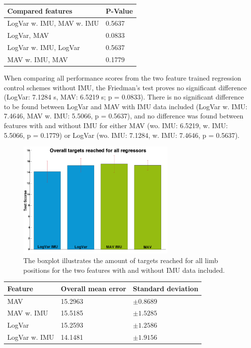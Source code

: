\begin{center}
	\begin{tabular}{l l}
		\toprule
		\textbf{Compared features} & \textbf{P-Value}\\
		\midrule
		LogVar w. IMU, MAV w. IMU & 0.5637 \\
		LogVar, MAV & 0.0833 \\
		LogVar w. IMU, LogVar & 0.5637 \\
		MAV w. IMU, MAV & 0.1779 \\
		\bottomrule
	\end{tabular}
\end{center}

When comparing all performance scores from the two feature trained regression control schemes without IMU, the Friedman's test proves no significant difference (LogVar: 7.1284 s, MAV: 6.5219 s; p = 0.0833). There is no significant difference to be found between LogVar and MAV with IMU data included (LogVar w. IMU: 7.4646, MAV w. IMU: 5.5066, p = 0.5637), and no difference was found between features with and without IMU for either MAV (wo. IMU: 6.5219, w. IMU: 5.5066, p = 0.1779) or LogVar (wo. IMU: 7.1284, w. IMU: 7.4646, p = 0.5637).


\begin{figure}[H]
	\includegraphics[width=0.7\textwidth]{figures/results/sumMoreBarsWithTargetsReachedForAllRegressors}  %
	\caption{The boxplot illustrates the amount of targets reached for all limb positions for the two features with and without IMU data included.}
	\label{fig:TargetsReachedOverall}  %
\end{figure}

\begin{center}
	\begin{tabular}{l l l}
		\toprule
		\textbf{Feature} & \textbf{Overall mean error} & \textbf{Standard deviation}\\
		\midrule
		MAV & 15.2963 & $\pm 0.8689$ \\
		MAV w. IMU & 15.5185 & $\pm 1.5285$ \\
		LogVar & 15.2593 & $\pm 1.2586$ \\
		LogVar w. IMU & 14.1481 & $\pm 1.9156$ \\
		\bottomrule
	\end{tabular}
\end{center}

